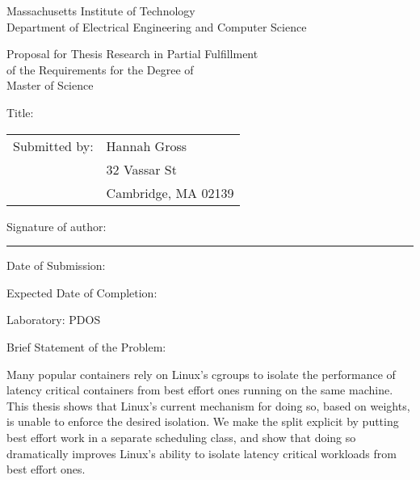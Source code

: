 
\begingroup
{}\large\selectfont


\begin{center}
Massachusetts Institute of Technology \\
Department of Electrical Engineering and Computer Science
\end{center}

\begin{center}
Proposal for Thesis Research in Partial Fulfillment \\
of the Requirements for the Degree of \\
Master of Science
\end{center}

\vspace{1em}
\noindent Title: \mytitle

\vspace{1em}
\noindent\begin{tabular}{@{}ll}
Submitted by: & Hannah Gross\\
              & 32 Vassar St \\
              & Cambridge, MA 02139
\end{tabular}

\vspace{1em}
\noindent Signature of author: \rule{5cm}{0.1pt}

\vspace{1em}
\noindent Date of Submission: \mydate

\vspace{1em}
\noindent Expected Date of Completion: \mycompletion

\vspace{1em}
\noindent Laboratory: PDOS

\vspace{1em}
\noindent Brief Statement of the Problem:

\vspace{1em}
\begin{minipage}{\dimexpr\textwidth-1cm}

\noindent Many popular containers rely on Linux's cgroups to isolate the
performance of latency critical containers from best effort ones running on the
same machine. This thesis shows that Linux's current mechanism for doing so,
based on weights, is unable to enforce the desired isolation. We make the split
explicit by putting best effort work in a separate scheduling class, and show
that doing so dramatically improves Linux's ability to isolate latency critical
workloads from best effort ones.

\end{minipage}

